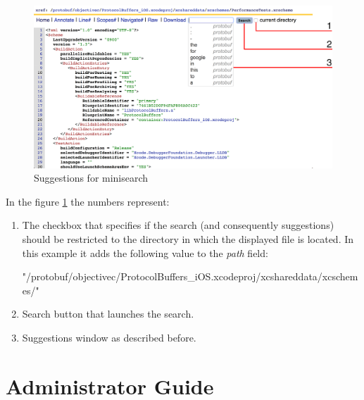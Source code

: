 \begin{figure}[htbp]
    \centering
    \includegraphics[width=145mm]{../img/minisearch.png}
    \caption{Suggestions for minisearch}
    \label{suggestions_minisearch}
\end{figure}

In the figure \ref{suggestions_minisearch} the numbers represent:
\begin{enumerate}
    \item The checkbox that specifies if the search (and consequently suggestions) should be restricted to the directory
    in which the displayed file is located. In this example it adds the following value to the \textit{path} field:
\begin{code}
"/protobuf/objectivec/ProtocolBuffers_iOS.xcodeproj/xcshareddata/xcschemes/"
\end{code}
    \item Search button that launches the search.
    \item Suggestions window as described before.
\end{enumerate}

\section{Administrator Guide}
\label{administrator_guide}

